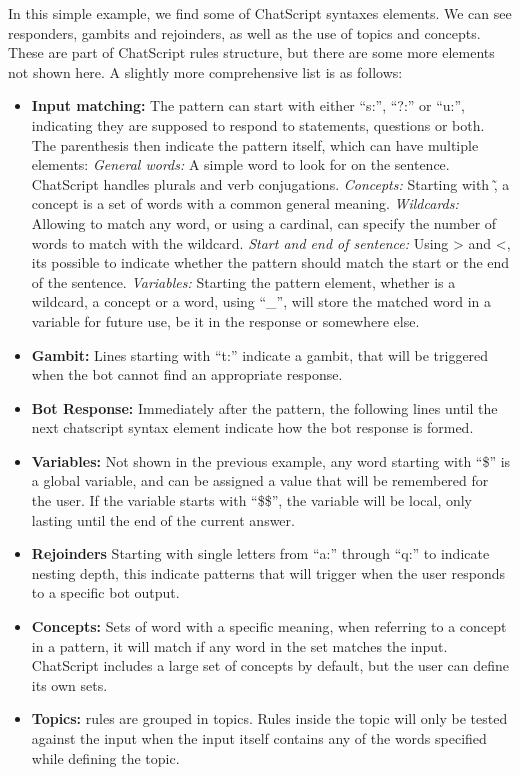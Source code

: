In this simple example, we find some of ChatScript syntaxes elements. We can see responders, gambits and rejoinders, as well as the use of topics and concepts. These are part of ChatScript rules structure, but there are some more elements not shown here. A slightly more comprehensive list is as follows:
\begin{itemize}
 \item \textbf{Input matching:} The pattern can start with either ``s:'', ``?:'' or ``u:'', indicating they are supposed to respond to statements, questions or both. The parenthesis then indicate the pattern itself, which can have multiple elements:
    \subitem \emph{General words:} A simple word to look for on the sentence. ChatScript handles plurals and verb conjugations.
    \subitem \emph{Concepts:} Starting with \~ , a concept is a set of words with a common general meaning.
    \subitem \emph{Wildcards:} Allowing to match any word, or using a cardinal, can specify the number of words to match with the wildcard.
    \subitem \emph{Start and end of sentence:} Using > and <, its possible to indicate whether the pattern should match the start or the end of the sentence.
    \subitem \emph{Variables: } Starting the pattern element, whether is a wildcard, a concept or a word, using ``\_'', will store the matched word in a variable for future use, be it in the response or somewhere else.
  \item \textbf{Gambit:} Lines starting with ``t:'' indicate a gambit, that will be triggered when the bot cannot find an appropriate response.
  \item \textbf{Bot Response:} Immediately after the pattern, the following lines until the next chatscript syntax element indicate how the bot response is formed.
  \item \textbf{Variables:} Not shown in the previous example, any word starting with ``\$'' is a global variable, and can be assigned a value that will be remembered for the user. If the variable starts with ``\$\$'', the variable will be local, only lasting until the end of the current answer.
  \item \textbf{Rejoinders} Starting with single letters from ``a:'' through ``q:'' to indicate nesting depth, this indicate patterns that will trigger when the user responds to a specific bot output.
  \item \textbf{Concepts:} Sets of word with a specific meaning, when referring to a concept in a pattern, it will match if any word in the set matches the input. ChatScript includes a large set of concepts by default, but the user can define its own sets.
  \item \textbf{Topics:} rules are grouped in topics. Rules inside the topic will only be tested against the input when the input itself contains any of the words specified while defining the topic.
\end{itemize}

